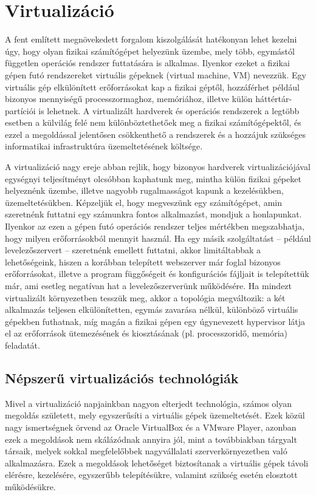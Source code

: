 \section{Virtualizáció}
A fent említett megnövekedett forgalom kiszolgálását hatékonyan lehet kezelni úgy, hogy olyan fizikai számítógépet helyezünk üzembe, mely  több, egymástól független operációs rendszer futtatására is alkalmas. Ilyenkor ezeket a fizikai gépen futó rendszereket virtuális gépeknek (virtual machine, VM) %
nevezzük. Egy virtuális gép elkülönített erőforrásokat kap a fizikai géptől, hozzáférhet például bizonyos mennyiségű processzormaghoz, memóriához, illetve külön háttértár-partíciói is lehetnek. A virtualizált hardverek és operációs rendszerek a legtöbb esetben a külvilág felé nem különböztethetőek meg a fizikai számítógépektől, és ezzel a megoldással jelentősen csökkenthető a rendszerek és a hozzájuk szükséges informatikai infrastruktúra üzemeltetésének költsége.

A virtualizáció nagy ereje abban rejlik, hogy bizonyos hardverek virtualizációjával egységnyi teljesítményt olcsóbban kaphatunk meg, mintha külön fizikai gépeket helyeznénk üzembe, illetve nagyobb rugalmasságot kapunk a kezelésükben, üzemeltetésükben. Képzeljük el, hogy megveszünk egy számítógépet, amin szeretnénk futtatni egy számunkra fontos alkalmazást, mondjuk a honlapunkat. Ilyenkor az ezen a gépen futó operációs rendszer teljes mértékben megszabhatja, hogy milyen erőforrásokból mennyit használ. Ha egy másik szolgáltatást -- például levelezőszervert -- szeretnénk emellett futtatni, akkor limitáltabbak a lehetőségeink, hiszen a korábban telepített webszerver már foglal bizonyos erőforrásokat, illetve a program függőségeit és konfigurációs fájljait is telepítettük már, ami esetleg negatívan hat a levelezőszerverünk működésére. Ha mindezt virtualizált környezetben tesszük meg, akkor a topológia megváltozik: a két alkalmazás teljesen elkülönítetten, egymás zavarása nélkül, különböző virtuális gépekben futhatnak, míg magán a fizikai gépen egy úgynevezett hypervisor látja el az erőforrások ütemezésének és kiosztásának (pl. processzoridő, memória) feladatát.

\subsection{Népszerű virtualizációs technológiák}
Mivel a virtualizáció napjainkban nagyon elterjedt technológia, számos olyan megoldás született, mely egyszerűsíti a virtuális gépek üzemeltetését. Ezek közül nagy ismertségnek örvend az Oracle VirtualBox és a VMware Player, azonban ezek a megoldások nem skálázódnak annyira jól, mint a továbbiakban tárgyalt társaik, melyek sokkal megfelelőbbek nagyvállalati szerverkörnyezetben való alkalmazásra. Ezek a megoldások lehetőséget biztosítanak a virtuális gépek távoli elérésre, kezelésére, egyszerűbb telepítésükre, valamint szükség esetén elosztott működésükre.

